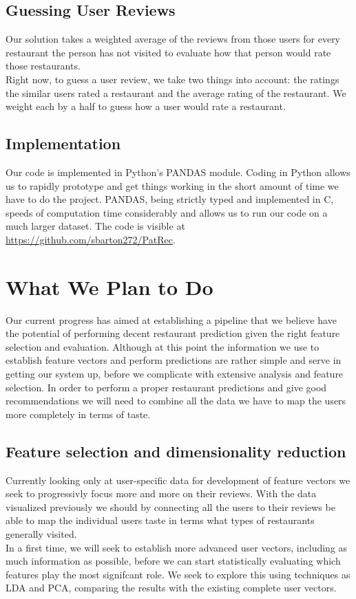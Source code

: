 \documentclass[10pt,twocolumn,letterpaper]{article}
\begin{document}
\subsection{Guessing User Reviews}
Our solution takes a weighted average of the reviews from those users for every restaurant the person has not visited to evaluate how that person would rate those restaurants.
\\[0.5em]
\indent Right now, to guess a user review, we take two things into account: the ratings the similar users rated a restaurant and the average rating of the restaurant. We weight each by a half to guess how a user would rate a restaurant.
\subsection{Implementation}
Our code is implemented in Python's PANDAS module. Coding in Python allows us to rapidly prototype and get things working in the short amount of time we have to do the project. PANDAS, being strictly typed and implemented in C, speeds of computation time considerably and allows us to run our code on a much larger dataset. The code is visible at \url{https://github.com/sbarton272/PatRec}.

\section{What We Plan to Do}
Our current progress has aimed at establishing a pipeline that we believe have the potential of performing decent restaurant prediction given the right feature selection and evaluation. Although at this point the information we use to establish feature vectors and perform predictions are rather simple and serve in getting our system up, before we complicate with extensive analysis and feature selection. In order to perform a proper restaurant predictions and give good recommendations we will need to combine all the data we have to map the users more completely in terms of taste.

\subsection{Feature selection and dimensionality reduction}
Currently looking only at user-specific data for development of feature vectors we seek to progressivly focus more and more on their reviews. With the data visualized previously we should by connecting all the users to their reviews be able to map the individual users taste in terms what types of restaurants generally visited. 
\\[.5em]
\indent In a first time, we will seek to establish more advanced user vectors, including as much information as possible, before we can start statistically evaluating which features play the most signifcant role. We seek to explore this using techniques as LDA and PCA, comparing the results with the existing complete user vectors.
\end{document}
